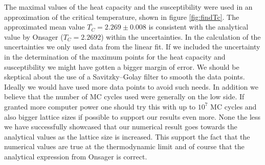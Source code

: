 \documentclass[%
 reprint,
nofootinbib,
aps,
]{revtex4-1}
\begin{document}
The maximal values of the heat capacity and the susceptibility were used in an approximation of the critical temperature, shown in figure \ref{fig:findTc}. The approximated mean value $\overline{T_C} = 2.269 \pm 0.008$ is consistent with the analytical value by Onsager ($T_C = 2.2692$) within the uncertainties. In the calculation of the uncertainties we only used data from the linear fit. If we included the uncertainty in the determination of the maximum points for the heat capacity and susceptibility we might have gotten a bigger margin of error. We should be skeptical about the use of a Savitzky–Golay filter to smooth the data points. Ideally we would have used more data points to avoid such needs. In addition we believe that the number of MC cycles used were generally on the low side. If granted more computer power one should try this with up to $10^7$ MC cycles and also bigger lattice sizes if possible to support our results even more. None the less we have successfully showcased that our numerical result goes towards the analytical values as the lattice size is increased. This support the fact that the numerical values are true at the thermodynamic limit and of course that the analytical expression from Onsager is correct. 

\newpage
\end{document}

